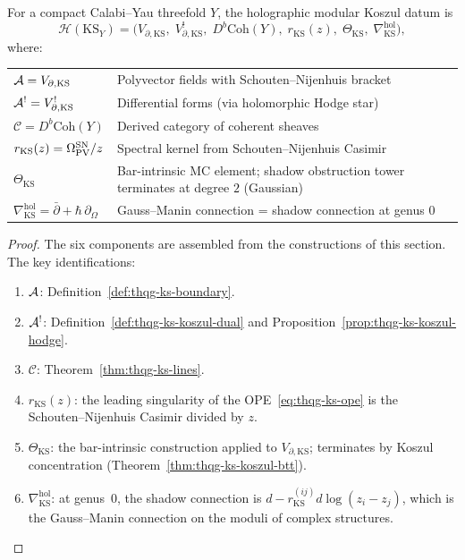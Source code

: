 \begin{theorem}
For a compact Calabi--Yau threefold $Y$, the holographic modular
Koszul datum is
\begin{equation}%
\mathcal{H}(\mathrm{KS}_Y)
= \bigl(
V_{\partial,\mathrm{KS}},\;
V_{\partial,\mathrm{KS}}^!,\;
D^b\mathrm{Coh}(Y),\;
r_{\mathrm{KS}}(z),\;
\Theta_{\mathrm{KS}},\;
\nabla^{\mathrm{hol}}_{\mathrm{KS}}
\bigr),
\end{equation}
where:
\begin{center}
\renewcommand{\arraystretch}{1.35}
\small
\begin{tabular}{lp{8.5cm}}
\hline
$\mathcal{A} = V_{\partial,\mathrm{KS}}$
 & Polyvector fields with Schouten--Nijenhuis bracket \\
$\mathcal{A}^! = V^!_{\partial,\mathrm{KS}}$
 & Differential forms (via holomorphic Hodge star) \\
$\mathcal{C} = D^b\mathrm{Coh}(Y)$
 & Derived category of coherent sheaves \\
$r_{\mathrm{KS}}(z) = \Omega_{\operatorname{PV}}^{\mathrm{SN}}/z$
 & Spectral kernel from Schouten--Nijenhuis Casimir \\
$\Theta_{\mathrm{KS}}$
 & Bar-intrinsic MC element; shadow obstruction tower terminates at
 degree $2$ (Gaussian) \\
$\nabla^{\mathrm{hol}}_{\mathrm{KS}} = \bar\partial + \hbar\,\partial_\Omega$
 & Gauss--Manin connection = shadow connection at genus $0$ \\
\hline
\end{tabular}
\end{center}
\end{theorem}

\begin{proof}
The six components are assembled from the constructions of this
section. The key identifications:
\begin{enumerate}[label=(\roman*)]
\item $\mathcal{A}$: Definition~\ref{def:thqg-ks-boundary}.
\item $\mathcal{A}^!$: Definition~\ref{def:thqg-ks-koszul-dual} and
 Proposition~\ref{prop:thqg-ks-koszul-hodge}.
\item $\mathcal{C}$: Theorem~\ref{thm:thqg-ks-lines}.
\item $r_{\mathrm{KS}}(z)$: the leading singularity of the
 OPE~\eqref{eq:thqg-ks-ope} is the Schouten--Nijenhuis Casimir
 divided by $z$.
\item $\Theta_{\mathrm{KS}}$: the bar-intrinsic construction applied
 to $V_{\partial,\mathrm{KS}}$; terminates by Koszul concentration
 (Theorem~\ref{thm:thqg-ks-koszul-btt}).
\item $\nabla^{\mathrm{hol}}_{\mathrm{KS}}$: at genus~$0$, the shadow
 connection is $d - r_{\mathrm{KS}}^{(ij)} d\log(z_i - z_j)$, which
 is the Gauss--Manin connection on the moduli of complex structures.
\end{enumerate}
\end{proof}


